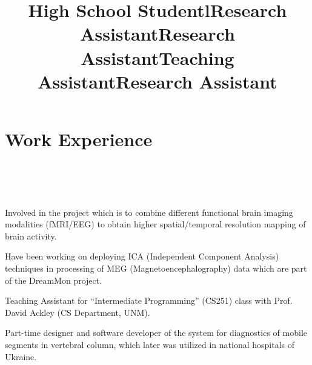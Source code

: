 \documentclass[10pt,overlapped,line]{res}
\begin{document}
\begin{resume}
\title{High School Student}
\begin{position}
\end{position}
 

\section{Work Experience}
\begin{format}
  \title{l}\\
  \\
  \body\\
\end{format}

\title{Research Assistant}
\begin{position}
  Involved in the project which is to combine different functional brain 
 imaging modalities (fMRI/EEG) to obtain higher spatial/temporal resolution 
 mapping of brain activity.
\end{position}

\title{Research Assistant}
\begin{position}
  Have been working  on deploying ICA (Independent Component
  Analysis) techniques in processing of MEG (Magnetoencephalography)
  data which are part of the DreamMon project.
  

\end{position}

\title{Teaching Assistant}
\begin{position}
  Teaching Assistant for ``Intermediate Programming'' (CS251) class
  with Prof. David Ackley (CS Department, UNM).
\end{position}


\title{Research Assistant}
\begin{position}
Part-time designer and software developer of the system for
diagnostics of mobile segments in vertebral column, which later was
utilized in national hospitals of Ukraine.
\end{position}


\end{resume}
\end{document}
